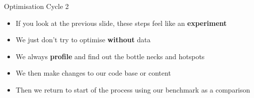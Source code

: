 \begin{frame}{Optimisation Cycle 2}
	\begin{itemize}
		\item If you look at the previous slide, these steps feel like an \textbf{experiment}
		\item We just don't try to optimise \textbf{without} data
		\item We always \textbf{profile} and find out the bottle necks and hotspots
		\item We then make changes to our code base or content
		\item Then we return to start of the process using our benchmark as a comparison
	\end{itemize}
\end{frame}


